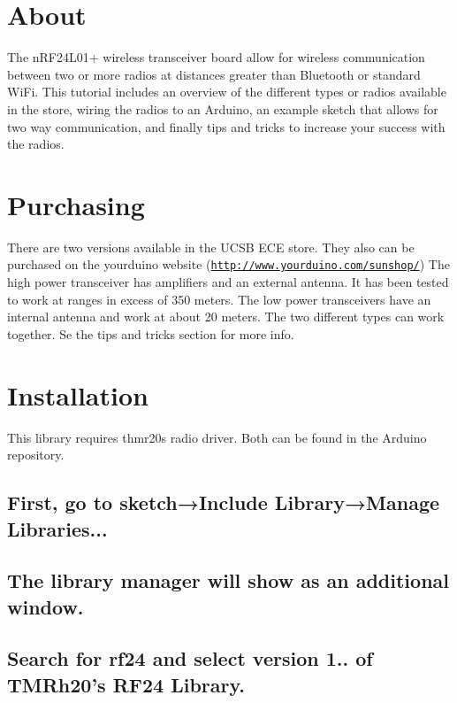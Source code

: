 \hypertarget{index_About}{}\section{About}\label{index_About}
The n\+R\+F24\+L01+ wireless transceiver board allow for wireless communication between two or more radios at distances greater than Bluetooth or standard Wi\+Fi. This tutorial includes an overview of the different types or radios available in the store, wiring the radios to an Arduino, an example sketch that allows for two way communication, and finally tips and tricks to increase your success with the radios.\hypertarget{index_Purchasing}{}\section{Purchasing}\label{index_Purchasing}
There are two versions available in the U\+C\+SB E\+CE store. They also can be purchased on the yourduino website (\href{http://www.yourduino.com/sunshop/}{\tt http\+://www.\+yourduino.\+com/sunshop/}) The high power transceiver has amplifiers and an external antenna. It has been tested to work at ranges in excess of 350 meters. The low power transceivers have an internal antenna and work at about 20 meters. The two different types can work together. Se the tips and tricks section for more info.\hypertarget{index_Installation}{}\section{Installation}\label{index_Installation}
This library requires thmr20\textquotesingle{}s radio driver. Both can be found in the Arduino repository.

\subsection*{First, go to sketch→\+Include Library→\+Manage Libraries...}

 \subsection*{The library manager will show as an additional window.}

\subsection*{Search for rf24 and select version 1.. of T\+M\+Rh20’s R\+F24 Library.}

